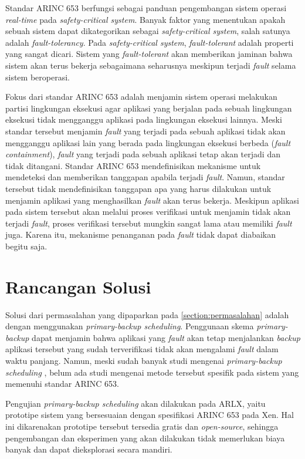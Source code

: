 Standar ARINC 653 berfungsi sebagai panduan pengembangan sistem operasi \textit{real-time} pada
\textit{safety-critical system}.  Banyak faktor yang menentukan apakah sebuah sistem dapat
dikategorikan sebagai \textit{safety-critical system}, salah satunya adalah
\textit{fault-tolerancy}.  Pada \textit{safety\hyp critical system}, \textit{fault-tolerant}
adalah properti yang sangat dicari.  Sistem yang \textit{fault-tolerant} akan memberikan jaminan
bahwa sistem akan terus bekerja sebagaimana seharusnya meskipun terjadi \textit{fault} selama
sistem beroperasi.

Fokus dari standar ARINC 653 adalah menjamin sistem operasi melakukan partisi lingkungan
eksekusi agar aplikasi yang berjalan pada sebuah lingkungan eksekusi tidak mengganggu aplikasi
pada lingkungan eksekusi lainnya. Meski standar tersebut menjamin \textit{fault} yang terjadi
pada sebuah aplikasi tidak akan mengganggu aplikasi lain yang berada pada lingkungan eksekusi
berbeda (\textit{fault containment}), \textit{fault} yang terjadi pada sebuah aplikasi tetap
akan terjadi dan tidak ditangani. Standar ARINC 653 mendefinisikan mekanisme untuk mendeteksi
dan memberikan tanggapan apabila terjadi \textit{fault}.  Namun, standar tersebut tidak
mendefinisikan tanggapan apa yang harus dilakukan untuk menjamin aplikasi yang menghasilkan
\textit{fault} akan terus bekerja. Meskipun aplikasi pada sistem tersebut akan melalui proses
verifikasi untuk menjamin tidak akan terjadi \textit{fault}, proses verifikasi tersebut mungkin
sangat lama atau memiliki \textit{fault} juga.  Karena itu, mekanisme penanganan pada \textit{fault}
tidak dapat diabaikan begitu saja.

\section{Rancangan Solusi}
\label{section:solution}

Solusi dari permasalahan yang dipaparkan pada \autoref{section:permasalahan} adalah dengan
menggunakan \textit{primary-backup scheduling}. Penggunaan skema \textit{primary-backup} dapat
menjamin bahwa aplikasi yang \textit{fault} akan tetap menjalankan \textit{backup} aplikasi
tersebut yang sudah terverifikasi tidak akan mengalami \textit{fault} dalam waktu panjang.
Namun, meski sudah banyak studi mengenai \textit{primary-backup scheduling} \citep{Campbell1986}
\citep{Bertossi2006}, belum ada studi mengenai metode tersebut spesifik pada sistem yang
memenuhi standar ARINC 653. 

Pengujian \textit{primary-backup scheduling} akan dilakukan pada ARLX, yaitu prototipe sistem
yang bersesuaian dengan spesifikasi ARINC 653 pada Xen. Hal ini dikarenakan prototipe tersebut
tersedia gratis dan \textit{open-source}, sehingga pengembangan dan eksperimen yang akan
dilakukan tidak memerlukan biaya banyak dan dapat dieksplorasi secara mandiri.

